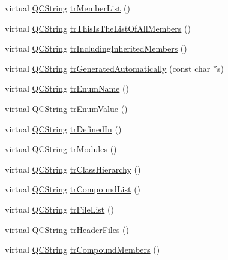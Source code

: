 \begin{DoxyCompactItemize}
\item 
virtual \mbox{\hyperlink{class_q_c_string}{Q\+C\+String}} \mbox{\hyperlink{class_translator_arabic_ac1b9bd9609dd06ea5bc2cef16325f0ff}{tr\+Member\+List}} ()
\item 
virtual \mbox{\hyperlink{class_q_c_string}{Q\+C\+String}} \mbox{\hyperlink{class_translator_arabic_ae6459d640e8d75ca221d49d248909758}{tr\+This\+Is\+The\+List\+Of\+All\+Members}} ()
\item 
virtual \mbox{\hyperlink{class_q_c_string}{Q\+C\+String}} \mbox{\hyperlink{class_translator_arabic_af27177157cd20751ef1bfbb2ac8186cf}{tr\+Including\+Inherited\+Members}} ()
\item 
virtual \mbox{\hyperlink{class_q_c_string}{Q\+C\+String}} \mbox{\hyperlink{class_translator_arabic_a5dd76439e7f830bd9384a1a48ffdd12d}{tr\+Generated\+Automatically}} (const char $\ast$s)
\item 
virtual \mbox{\hyperlink{class_q_c_string}{Q\+C\+String}} \mbox{\hyperlink{class_translator_arabic_a52b5269a3a05a149a3320d3ade072ec9}{tr\+Enum\+Name}} ()
\item 
virtual \mbox{\hyperlink{class_q_c_string}{Q\+C\+String}} \mbox{\hyperlink{class_translator_arabic_ae9b4ecec9913389fea6432dc2171afb5}{tr\+Enum\+Value}} ()
\item 
virtual \mbox{\hyperlink{class_q_c_string}{Q\+C\+String}} \mbox{\hyperlink{class_translator_arabic_a58eecd6376efdc45deb1b9154c7130e1}{tr\+Defined\+In}} ()
\item 
virtual \mbox{\hyperlink{class_q_c_string}{Q\+C\+String}} \mbox{\hyperlink{class_translator_arabic_a3b3d2c2a89ac09a21da233223676a26f}{tr\+Modules}} ()
\item 
virtual \mbox{\hyperlink{class_q_c_string}{Q\+C\+String}} \mbox{\hyperlink{class_translator_arabic_ab0007c6202f51fdafa65ef7a92852660}{tr\+Class\+Hierarchy}} ()
\item 
virtual \mbox{\hyperlink{class_q_c_string}{Q\+C\+String}} \mbox{\hyperlink{class_translator_arabic_a2bdcaaf56978992febf487f7721ca050}{tr\+Compound\+List}} ()
\item 
virtual \mbox{\hyperlink{class_q_c_string}{Q\+C\+String}} \mbox{\hyperlink{class_translator_arabic_a5524b85023dedf84436fb7fabb517f1d}{tr\+File\+List}} ()
\item 
virtual \mbox{\hyperlink{class_q_c_string}{Q\+C\+String}} \mbox{\hyperlink{class_translator_arabic_a2e6a79881591570625da5a0527f0eb8f}{tr\+Header\+Files}} ()
\item 
virtual \mbox{\hyperlink{class_q_c_string}{Q\+C\+String}} \mbox{\hyperlink{class_translator_arabic_a83e2c9dec5c0946efa2aae772d953b81}{tr\+Compound\+Members}} ()

\end{DoxyCompactItemize}

